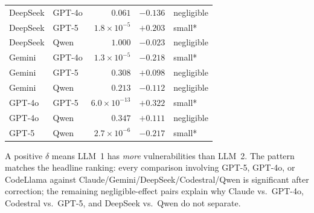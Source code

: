 \documentclass[11pt]{article}
\begin{document}
\begin{table}[H]
\begin{tabular}{@{}llrrl@{}}
DeepSeek   & GPT-4o     & $0.061$                 & $-0.136$ & negligible \\
DeepSeek   & GPT-5      & $1.8\!\times\!10^{-5}$  & $+0.203$ & small*     \\
DeepSeek   & Qwen       & $1.000$                 & $-0.023$ & negligible \\
Gemini     & GPT-4o     & $1.3\!\times\!10^{-5}$  & $-0.218$ & small*     \\
Gemini     & GPT-5      & $0.308$                 & $+0.098$ & negligible \\
Gemini     & Qwen       & $0.213$                 & $-0.112$ & negligible \\
GPT-4o     & GPT-5      & $6.0\!\times\!10^{-13}$ & $+0.322$ & small*     \\
GPT-4o     & Qwen       & $0.347$                 & $+0.111$ & negligible \\
GPT-5      & Qwen       & $2.7\!\times\!10^{-6}$  & $-0.217$ & small*     \\
\bottomrule
\end{tabular}
\end{table}

A positive $\delta$ means LLM~1 has \emph{more} vulnerabilities than LLM~2. The pattern matches the headline ranking: every comparison involving GPT-5, GPT-4o, or CodeLlama against Claude/Gemini/DeepSeek/Codestral/Qwen is significant after correction; the remaining negligible-effect pairs explain why Claude vs.\ GPT-4o, Codestral vs.\ GPT-5, and DeepSeek vs.\ Qwen do not separate.

\end{document}

